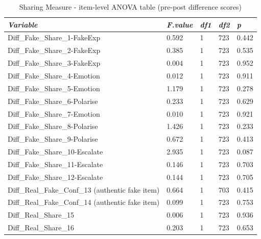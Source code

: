 \documentclass[empirical, authordate]{jote-new-article}
\begin{document}
\begin{table}

  \caption{Sharing Measure - item-level ANOVA table (pre-post difference scores)}
  \label{tab:tableS28}


  \begin{tabularx}{\linewidth}{@{} X  l  l  l  l@{}}

    \toprule
    \emph{Variable}                                  & \emph{F.value} & \emph{df1} & \emph{df2} & \emph{p} \\
    \midrule
    Diff\_Fake\_Share\_1-FakeExp                     & 0.592          & 1          & 723        & 0.442    \\
    Diff\_Fake\_Share\_2-FakeExp                     & 0.385          & 1          & 723        & 0.535    \\
    Diff\_Fake\_Share\_3-FakeExp                     & 0.004          & 1          & 723        & 0.952    \\
    Diff\_Fake\_Share\_4-Emotion                     & 0.012          & 1          & 723        & 0.911    \\
    Diff\_Fake\_Share\_5-Emotion                     & 1.179          & 1          & 723        & 0.278    \\
    Diff\_Fake\_Share\_6-Polarise                    & 0.233          & 1          & 723        & 0.629    \\
    Diff\_Fake\_Share\_7-Emotion                     & 0.010          & 1          & 723        & 0.921    \\
    Diff\_Fake\_Share\_8-Polarise                    & 1.426          & 1          & 723        & 0.233    \\
    Diff\_Fake\_Share\_9-Polarise                    & 0.672          & 1          & 723        & 0.413    \\
    Diff\_Fake\_Share\_10-Escalate                   & 2.935          & 1          & 723        & 0.087    \\
    Diff\_Fake\_Share\_11-Escalate                   & 0.146          & 1          & 723        & 0.703    \\
    Diff\_Fake\_Share\_12-Escalate                   & 0.144          & 1          & 723        & 0.705    \\
    Diff\_Real\_Fake\_Conf\_13 (authentic fake item) & 0.664          & 1          & 703        & 0.415    \\
    Diff\_Real\_Fake\_Conf\_14 (authentic fake item) & 0.099          & 1          & 723        & 0.753    \\
    Diff\_Real\_Share\_15                            & 0.006          & 1          & 723        & 0.936    \\
    Diff\_Real\_Share\_16                            & 0.203          & 1          & 723        & 0.653    \\
    \bottomrule
  \end{tabularx}


\end{table}
\end{document}
